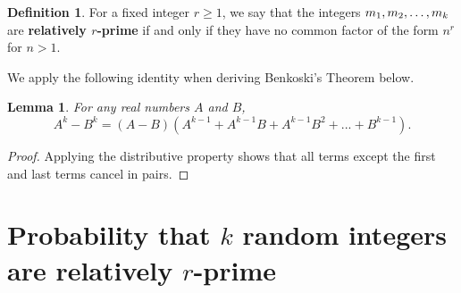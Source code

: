 \documentclass[10pt,a4paper]{article}
\newtheorem{lemma}[theorem]{Lemma}
\theoremstyle{definition}
\newtheorem{definition}{Definition}[section]
\theoremstyle{remark}
\newtheorem{remark}{Remark}
\begin{document}
\begin{definition} For a fixed integer \(r\geq 1\), we say that the integers \(m_1,m_2,\mathellipsis,m_k\) are \textbf{relatively \(r\)-prime} if and only if they have no common factor of the form \(n^r\) for \(n>1\). 
\end{definition}

	
	
	

We apply the following identity when deriving Benkoski's Theorem below.

\begin{lemma} \label{difference-powers} For any real numbers $A$ and $B$,
$$A^k-B^k=(A-B)(A^{k-1}+A^{k-1}B+A^{k-1}B^2+ ... + B^{k-1}).$$
\end{lemma}

\begin{proof}
Applying the distributive property shows that all terms except the first and last terms cancel in pairs.
\end{proof}

\section{Probability that \texorpdfstring{\(k\)}{} random integers are relatively \texorpdfstring{\(r\)}{}-prime}
\end{document}
